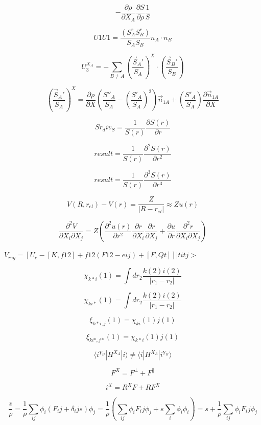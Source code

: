 \documentclass{article}
\begin{document}
\[
 -\frac{\partial \rho}{\partial X_A}\frac{\partial S}{\partial \rho}\frac{1}{S}
\]
\pagebreak

\[
 U1\dot U1 = \frac{\left(S^r_A S^r_B\right)}{S_A S_B} n_A \cdot n_B
\]
\pagebreak

\[
U_3^{X_A} = -\sum_{B\neq A}\left(\frac{\vec S_A'}{S_A}\right)^X\cdot\left(\frac{\vec S_B'}{S_B}\right)
\]
\pagebreak

\[
\left(\frac{\vec S_A'}{S_A}\right)^X =
    \frac{\partial \rho}{\partial X}\left(\frac{S''_A}{S_A}
         -\left(\frac{S'_A}{S_A}\right)^2\right)\vec n_{1A}
    + \left(\frac{S'_A}{S_A}\right)\frac{\partial \vec n_{1A}}{\partial X}
\]
\pagebreak

\[
    Sr_div_S = \frac{1}{S(r)}\frac{\partial S(r)}{\partial r}
\]
\pagebreak

\[
    result = \frac{1}{S(r)}\frac{\partial^2 S(r)}{\partial r^2}
\]
\pagebreak

\[
   result = \frac{1}{S(r)}\frac{\partial^3 S(r)}{\partial r^3}
\]
\pagebreak

\[
V(R,r_{el}) -V(r) =\frac{Z}{|R-r_{el}|} \approx Z u(r) \]
\pagebreak

\[
\frac{\partial^2 V}{\partial X_i\partial X_j}
  =  Z \left(\frac{\partial^2 u(r)}{\partial r^2} \frac{\partial r}{\partial X_i}
     \frac{\partial r}{\partial X_j} + \frac{\partial u}{\partial r}
     \frac{\partial^2 r}{\partial X_i \partial X_j}\right)
\]
\pagebreak

$ V_{reg} = [ U_e - [K,f12] + f12(F12-eij) + [F,Qt] ]|titj> $
\pagebreak

\[ \chi_{k{*} i}(1) = \int dr_2 \frac{k(2) i(2)}{|r_1-r_2|} \]
\pagebreak

\[ \chi_{ki{*}}(1) = \int dr_2 \frac{k(2) i(2)}{|r_1-r_2|} \]
\pagebreak

\[ \xi_{k{*}i,j}(1) = \chi_{ki}(1) j(1) \]
\pagebreak

\[ \xi_{ki{*},j{*}}(1) = \chi_{k{*}i}(1) j(1) \]
\pagebreak

\[
 \langle i^{Y_B}|H^{X_A}|i\rangle \neq \langle i|H^{X_A}|i^{Y_B}\rangle
\]
\pagebreak

\[
    F^X = F^\perp + F^\parallel
\]
\pagebreak

\[
  i^X   = R^X F + R F^X
\]
\pagebreak

\[
\frac{\bar \epsilon}{\rho} = \frac{1}{\rho}\sum_{ij}\phi_i(F_ij+\delta_ij s)\phi_j
       = \frac{1}{\rho} ( \sum_{ij}\phi_i F_ij \phi_j + s\sum_i\phi_i\phi_i )
       = s + \frac{1}{\rho} \sum_{ij}\phi_i F_ij \phi_j
\]
\pagebreak
\end{document}
